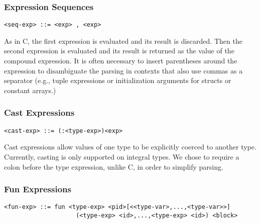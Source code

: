 \documentclass[titlepage,10pt]{article}
\begin{document}
\subsubsection{Expression Sequences}


\begin{verbatim}
<seq-exp> ::= <exp> , <exp>
\end{verbatim}

As in C, the first expression is evaluated and its result is discarded.
Then the second expression is evaluated and its result is returned as
the value of the compound expression.  It is often necessary to insert
parentheses around the expression to disambiguate the parsing in
contexts that also use commas as a separator (e.g., tuple expressions or
initialization arguments for structs or constant arrays.)

\subsubsection{Cast Expressions}


\begin{verbatim}
<cast-exp> ::= (:<type-exp>)<exp>
\end{verbatim}

Cast expressions allow values of one type to be explicitly coerced to
another type.  Currently, casting is only supported on integral types.
We chose to require a colon before the type expression, unlike C, in
order to simplify parsing.

\subsubsection{Fun Expressions}


\begin{verbatim}
<fun-exp> ::= fun <type-exp> <pid>[<<type-var>,...,<type-var>>]
                    (<type-exp> <id>,...,<type-exp> <id>) <block>
\end{verbatim}
\end{document}
